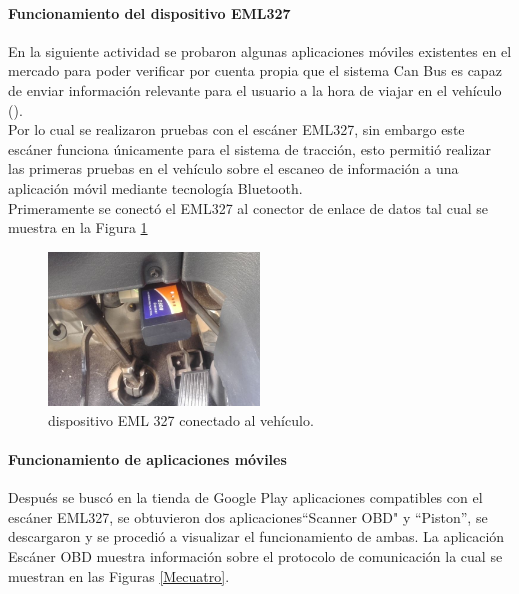 \paragraph{Funcionamiento del dispositivo EML327}

En la siguiente actividad se probaron algunas aplicaciones móviles existentes en el mercado para poder verificar por cuenta propia que el sistema Can Bus es capaz de enviar información relevante para el usuario a la hora de viajar en el vehículo (\cite{GB2}).\\

Por lo cual se realizaron pruebas con el escáner EML327, sin embargo este escáner funciona únicamente  para el sistema de tracción, esto permitió realizar las primeras pruebas en el vehículo sobre el escaneo de información a una aplicación móvil mediante tecnología Bluetooth. \\

Primeramente se conectó el EML327 al conector de enlace de datos tal cual se muestra en la Figura \ref{Metres}\\

%
\begin{figure}[H]
\centering
\includegraphics[width=0.5\textwidth]{metodologia/elm327.jpg}
\caption{dispositivo EML 327 conectado al vehículo.}
\label{Metres}
\end{figure}


\paragraph{Funcionamiento de aplicaciones móviles}

Después se buscó en la tienda de Google Play aplicaciones compatibles con el escáner EML327, se obtuvieron dos aplicaciones``Scanner OBD" y ``Piston”, se descargaron y se procedió a visualizar el funcionamiento de ambas. La aplicación Escáner OBD muestra información sobre el protocolo de comunicación la cual se muestran en las Figuras \ref{Mecuatro}. 

